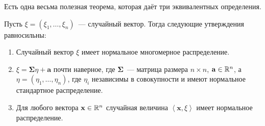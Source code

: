 Есть одна весьма полезная теорема, которая даёт три эквивалентных определения.
\begin{theorem}
	Пусть \(\xi = (\xi_{1}, \dots, \xi_{n})\)~--- случайный вектор. Тогда следующие утверждения равносильны:
	\begin{enumerate}
		\item Случайный вектор \(\xi\) имеет нормальное многомерное распределение.
		\item \(\xi = \mathbf{\Sigma}\eta + \mathbf{a}\) почти наверное, где \(\mathbf{\Sigma}\)~--- матрица размера \(n \times n\), \(\mathbf{a} \in \mathbb{R}^n\), а \(\eta = (\eta_{1}, \dots, \eta_{n})\), где \(\eta_{i}\) независимы в совокупности и имеют нормальное стандартное распределение.
		\item Для любого вектора \(\mathbf{x} \in \mathbb{R}^n\) случайная величина \(\left\langle\mathbf{x}, \xi\right\rangle\) имеет нормальное распределение.
	\end{enumerate}
\end{theorem}
